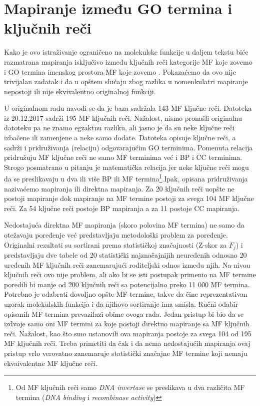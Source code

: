\section{Mapiranje između GO termina i \swissprot ključnih reči}
\label{kw2go_mapiranje}

Kako je ovo istraživanje ograničeno na molekulske funkcije u daljem tekstu biće
razmatrana mapiranja isključivo između ključnih reči kategorije MF koje zovemo
 i GO termina imenskog prostora MF koje zovemo
. Pokazaćemo da ovo nije trivijalan zadatak i da u opštem
slučaju zbog razlika u nomenkulatri mapiranje nepostoji ili nije ekvivalentno
originalnoj funkciji.

U originalnom radu navodi se da je \swissprot baza sadržala 143 MF ključne
reči.  Datoteka  \cite{keywlist_txt} iz 20.12.2017 sadrži
195 MF ključnih reči.  Nažalost, nismo pronašli originalnu 
datoteku pa  ne znamo egzaktnu razliku, ali jasno je da su neke ključne reči
izbačene ili zamenjene a neke samo dodate. Datoteka  opisuje
ključne reči, a sadrži i pridruživanja (relaciju) odgovarajućim GO
terminima. Pomenuta relacija pridružuju MF ključne reči ne samo MF terminima već
i BP i CC terminima. Strogo posmatrano u pitanju je matematička relacija jer
neke ključne reči mogu da se preslikavaju u dva ili više BP ili MF
termina\footnote{Od MF ključnih reči samo \textit{DNA invertase} se preslikava
u dva različita MF termina (\textit{DNA binding} i \textit{recombinase
activity})}.Ipak, opisana pridruživanja nazivaćemo mapiranja ili direktna
mapiranja.  Za 20 ključnih reči uopšte ne postoji mapiranje 
dok mapiranje na MF termine postoji za svega 104 MF ključne reči. Za 54
ključne reči postoje BP mapiranja a za 11 postoje CC mapiranja.

Nedostajuća direktna MF mapiranja (skoro polovina MF termina) ne samo da
otežavaju poređenje već predstavljaju metodološki problem za poređenje.
Originalni rezultati su sortirani prema statističkoj značajnosti (Z-skor za
$F_j$) i predstavljaju dve tabele od 20 statistički najznačajnijih neuređenih
odnosno 20 uređenih MF ključnih reči zanemarujući roditeljski odnos između
njih. Na nivou ključnih reči ovo nije problem, ali ako bi se isti postupak
primenio na MF termine poredili bi manje od 200 ključnih reči sa potencijalno
preko 11 000 MF termina. Potrebno je odabrati dovoljno opšte MF termine,
takve da čine reprezentativan uzorak molekulskih funkcija i da njihovo
sortiranje ima smisla. Ručni odabir opisanih MF termina prevazilazi obime
ovoga rada. Jedan pristup bi bio da se izdvoje samo oni MF termini za koje
postoji direktno mapiranje sa MF ključnih reči.  Nažalost, kao što smo
ustanovili ova mapiranja postoje za svega 104 od 195 MF ključnih reči.  Treba
primetiti da čak i da nema nedostajućih mapiranja ovaj pristup vrlo verovatno
zanemaruje statistički značajne MF termine koji nemaju ekvaivalentne MF ključne
reči.

